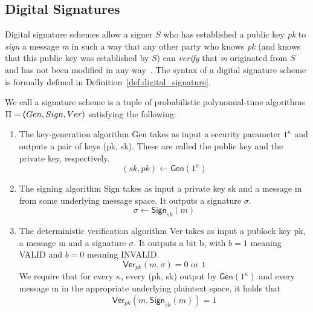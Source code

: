 \subsection{Digital Signatures}
Digital signature schemes allow a signer $S$ who has established a public key \emph{pk} to \emph{sign} a message \emph{m} in such a way that any other party who knows \emph{pk} (and knows that this public key was established by $S$) can \emph{verify} that \emph{m} originated from $S$ and has not been modified in any way~\cite{katz_lindell}.
The syntax of a digital signature scheme is formally defined in Definition~\ref{def:digital_signature}.

\begin{defn}
	\label{def:digital_signature}
	We call a \textsf{signature scheme} is a tuple of probabilistic polynomial-time algorithms $\Pi = \textsf(Gen, Sign, Ver)$ satisfying the following:
	\begin{enumerate}
		\item The \textsf{key-generation algorithm Gen} takes as input a security parameter $1^\kappa$ and outputs a pair of keys (pk, sk). These are called the \textsf{public key} and the \textsf{private key}, respectively.
		\begin{equation*}
			(sk, pk) \leftarrow \textsf{Gen}(1^\kappa)
		\end{equation*}
		\item The \textsf{signing algorithm Sign} takes as input a private key sk and a message m from some underlying message space. It outputs a signature $\sigma$.
		\begin{equation*}
			\sigma \leftarrow \textsf{Sign}_{sk}(m)
		\end{equation*}
		\item The deterministic \textsf{verification algorithm Ver} takes as input a publock key pk, a message m and a signature $\sigma$. It outputs a bit b, with $b = 1$ meaning VALID and $b = 0$ meaning INVALID. 
		\begin{equation*}
			\textsf{Ver}_{pk}(m, \sigma) = 0 \text{ or } 1
		\end{equation*}
		We require that for every $\kappa$, every (pk, sk) output by $\textsf{Gen}(1^\kappa)$ and every message m in the appropriate underlying plaintext space, it holds that
		\begin{equation*}
			\textsf{Ver}_{pk}(m, \textsf{Sign}_{sk}(m)) = 1
		\end{equation*} 
	\end{enumerate}
\end{defn}

